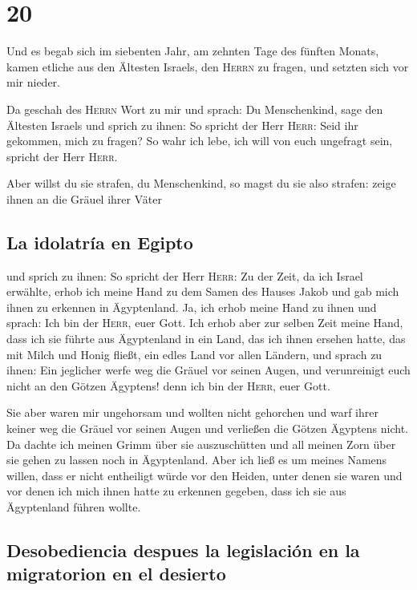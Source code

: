 \hypertarget{section-19}{%
\section{20}\label{section-19}}

 Und es begab sich im siebenten Jahr, am zehnten Tage des
fünften Monats, kamen etliche aus den Ältesten Israels, den
\textsc{Herrn} zu fragen, und setzten sich vor mir nieder.

 Da geschah des \textsc{Herrn} Wort zu mir und sprach:
 Du Menschenkind, sage den Ältesten Israels und sprich zu
ihnen: So spricht der Herr \textsc{Herr}: Seid ihr gekommen, mich zu
fragen? So wahr ich lebe, ich will von euch ungefragt sein, spricht der
Herr \textsc{Herr}.

 Aber willst du sie strafen, du Menschenkind, so magst du
sie also strafen: zeige ihnen an die Gräuel ihrer Väter

\hypertarget{la-idolatruxeda-en-egipto}{%
\subsection{La idolatría en Egipto}\label{la-idolatruxeda-en-egipto}}

 und sprich zu ihnen: So spricht der Herr \textsc{Herr}:
Zu der Zeit, da ich Israel erwählte, erhob ich meine Hand zu dem Samen
des Hauses Jakob und gab mich ihnen zu erkennen in Ägyptenland. Ja, ich
erhob meine Hand zu ihnen und sprach: Ich bin der \textsc{Herr}, euer
Gott.  Ich erhob aber zur selben Zeit meine Hand, dass ich
sie führte aus Ägyptenland in ein Land, das ich ihnen ersehen hatte, das
mit Milch und Honig fließt, ein edles Land vor allen Ländern,
 und sprach zu ihnen: Ein jeglicher werfe weg die Gräuel
vor seinen Augen, und verunreinigt euch nicht an den Götzen Ägyptens!
denn ich bin der \textsc{Herr}, euer Gott.

 Sie aber waren mir ungehorsam und wollten nicht gehorchen
und warf ihrer keiner weg die Gräuel vor seinen Augen und verließen die
Götzen Ägyptens nicht. Da dachte ich meinen Grimm über sie auszuschütten
und all meinen Zorn über sie gehen zu lassen noch in Ägyptenland.
 Aber ich ließ es um meines Namens willen, dass er nicht
entheiligt würde vor den Heiden, unter denen sie waren und vor denen ich
mich ihnen hatte zu erkennen gegeben, dass ich sie aus Ägyptenland
führen wollte.

\hypertarget{desobediencia-despues-la-legislaciuxf3n-en-la-migratorion-en-el-desierto}{%
\subsection{Desobediencia despues la legislación en la migratorion en el
desierto}\label{desobediencia-despues-la-legislaciuxf3n-en-la-migratorion-en-el-desierto}}

